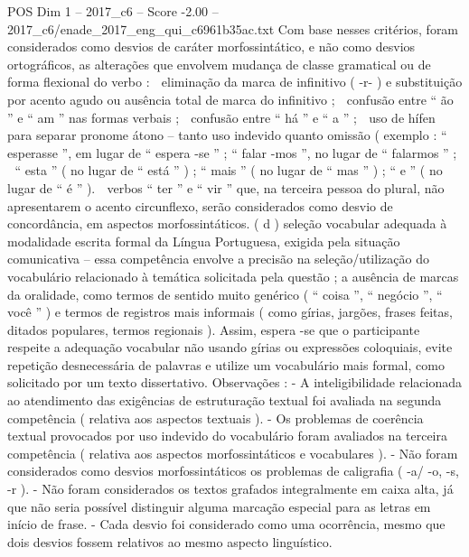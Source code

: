 \begin{textsample}{POS Dim 1 – 2017\_c6 – Score -2.00 – 2017\_c6/enade\_2017\_eng\_qui\_c6961b35ac.txt}
Com base nesses critérios, foram considerados como desvios de caráter morfossintático, e não como desvios ortográficos, as alterações que envolvem mudança de classe gramatical ou de forma flexional do verbo :  eliminação da marca de infinitivo ( -r- ) e substituição por acento agudo ou ausência total de marca do infinitivo ;  confusão entre “ ão ” e “ am ” nas formas verbais ;  confusão entre “ há ” e “ a ” ;  uso de hífen para separar pronome átono – tanto uso indevido quanto omissão ( exemplo : “ esperasse ”, em lugar de “ espera -se ” ; “ falar -mos ”, no lugar de “ falarmos ” ;  “ esta ” ( no lugar de “ está ” ) ; “ mais ” ( no lugar de “ mas ” ) ; “ e ” ( no lugar de “ é ” ).  verbos “ ter ” e “ vir ” que, na terceira pessoa do plural, não apresentarem o acento circunflexo, serão considerados como desvio de concordância, em aspectos morfossintáticos. ( d ) seleção vocabular adequada à modalidade escrita formal da Língua Portuguesa, exigida pela situação comunicativa – essa competência envolve a precisão na seleção/utilização do vocabulário relacionado à temática solicitada pela questão ; a ausência de marcas da oralidade, como termos de sentido muito genérico ( “ coisa ”, “ negócio ”, “ você ” ) e termos de registros mais informais ( como gírias, jargões, frases feitas, ditados populares, termos regionais ).
Assim, espera -se que o participante respeite a adequação vocabular não usando gírias ou expressões coloquiais, evite repetição desnecessária de palavras e utilize um vocabulário mais formal, como solicitado por um texto dissertativo.
Observações : - A inteligibilidade relacionada ao atendimento das exigências de estruturação textual foi avaliada na segunda competência ( relativa aos aspectos textuais ). - Os problemas de coerência textual provocados por uso indevido do vocabulário foram avaliados na terceira competência ( relativa aos aspectos morfossintáticos e vocabulares ). - Não foram considerados como desvios morfossintáticos os problemas de caligrafia ( -a/ -o, -s, -r ). - Não foram considerados os textos grafados integralmente em caixa alta, já que não seria possível distinguir alguma marcação especial para as letras em início de frase. - Cada desvio foi considerado como uma ocorrência, mesmo que dois desvios fossem relativos ao mesmo aspecto linguístico.

\end{textsample}
